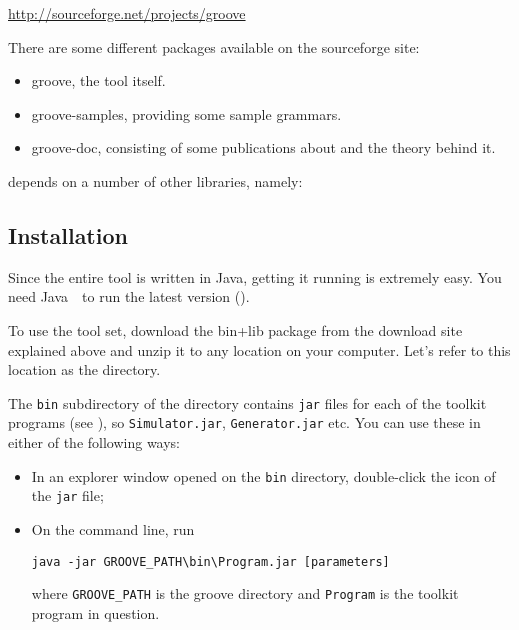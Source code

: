 \begin{center}
\url{http://sourceforge.net/projects/groove}
\end{center}
%
There are some different packages available on the sourceforge site:
%
\begin{itemize}[noitemsep]
\item \textsf{groove}, the tool itself.
\item \textsf{groove-samples}, providing some sample grammars.
\item \textsf{groove-doc}, consisting of some publications about \GROOVE and
  the theory behind it.
\end{itemize}
%
\GROOVE depends on a number of other libraries, namely:

\DTLsetseparator{;}

\begin{itemize}[noitemsep]
\end{itemize}

\subsection{Installation}

Since the entire \GROOVE tool is written in Java, getting it running is
extremely easy. You need Java~\javaVersion\ to run the latest \GROOVE version (\grooveVersion).



\medskip\noindent
To use the \GROOVE tool set, download the bin+lib package from the download
site explained above and unzip it to any location on your computer. Let's refer
to this location as the \GROOVE directory.

The \texttt{bin} subdirectory of the \GROOVE directory contains \texttt{jar}
files for each of the toolkit programs (see ), so
\texttt{Simulator.jar}, \texttt{Generator.jar} etc. You can use these in either of
the following ways:
\begin{itemize}
\item In an explorer window opened on the \texttt{bin} directory, double-click
  the icon of the \texttt{jar} file;
\item On the command line, run
%
\begin{verbatim}
java -jar GROOVE_PATH\bin\Program.jar [parameters]
\end{verbatim}
%
  where \texttt{GROOVE\_PATH} is the groove directory and \texttt{Program} is
  the toolkit program in question.
\end{itemize}
